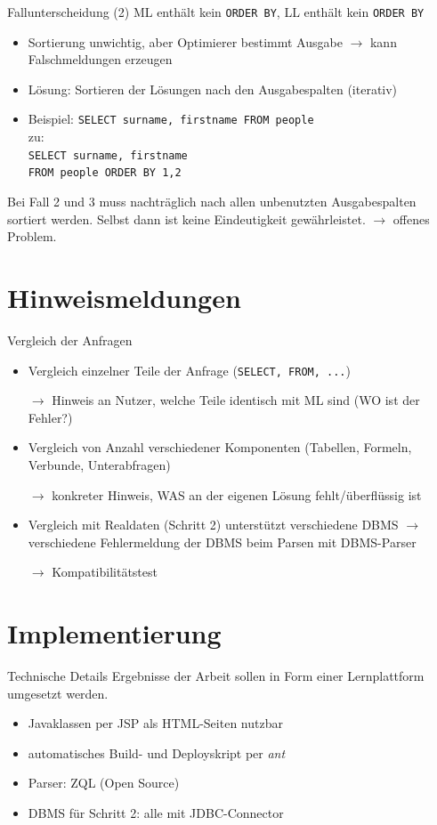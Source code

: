 \documentclass{beamer}
\begin{document}
\begin{frame}[fragile]{Fallunterscheidung (2)}
ML enthält kein \verb|ORDER BY|, LL enthält kein \verb|ORDER BY|
\begin{itemize}
\item Sortierung unwichtig, aber Optimierer bestimmt Ausgabe $\to$ kann Falschmeldungen erzeugen
\item Lösung: Sortieren der Lösungen nach den Ausgabespalten (iterativ)
\item Beispiel: \verb|SELECT surname, firstname FROM people|\\
zu:\\\verb|SELECT surname, firstname|\\\verb|FROM people ORDER BY 1,2|
\end{itemize}
Bei Fall 2 und 3 muss nachträglich nach allen unbenutzten Ausgabespalten sortiert werden. Selbst dann ist keine Eindeutigkeit gewährleistet. $\to$ offenes Problem.
\end{frame}

\section{Hinweismeldungen}

\begin{frame}[fragile]{Vergleich der Anfragen}
\begin{itemize}
\item Vergleich einzelner Teile der Anfrage (\verb|SELECT, FROM, ...|)
\item[$\to$] Hinweis an Nutzer, welche Teile identisch mit ML sind (WO ist der Fehler?)
\item Vergleich von Anzahl verschiedener Komponenten (Tabellen, Formeln, Verbunde, Unterabfragen)
\item[$\to$] konkreter Hinweis, WAS an der eigenen Lösung fehlt/überflüssig ist
\item Vergleich mit Realdaten (Schritt 2) unterstützt verschiedene DBMS $\to$ verschiedene Fehlermeldung der DBMS beim Parsen mit DBMS-Parser
\item[$\to$] Kompatibilitätstest 
\end{itemize}
\end{frame}


\section{Implementierung}


\begin{frame}[fragile]{Technische Details}
Ergebnisse der Arbeit sollen in Form einer Lernplattform umgesetzt werden.
\vspace{5mm}
\begin{itemize}
\item Javaklassen per JSP als HTML-Seiten nutzbar
\item automatisches Build- und Deployskript per \textit{ant}
\item Parser: ZQL (Open Source)
\item DBMS für Schritt 2: alle mit JDBC-Connector 
\end{itemize}
\end{frame}
\end{document}
